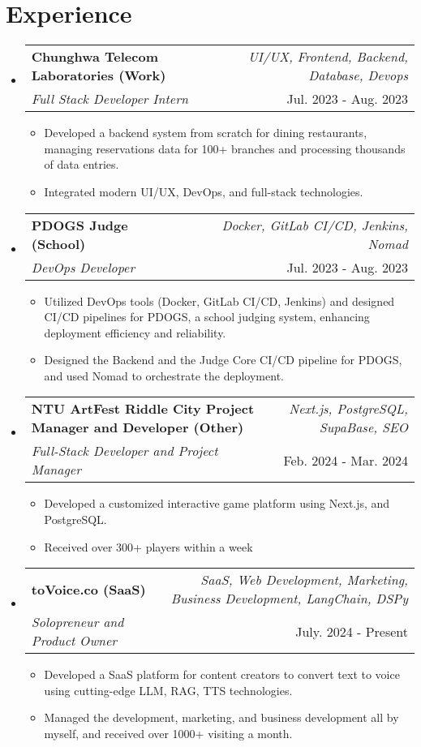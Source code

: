 \documentclass[a4paper,11pt]{article}
\makeatletter
\newcommand{\resumeSubheading}[4]{
\vspace{0.5mm}\item
    \begin{tabular*}{0.98\textwidth}[t]{l@{\extracolsep{\fill}}r}
        \textbf{#1} & \textit{\footnotesize{#4}} \\
        \textit{\footnotesize{#3}} &  \footnotesize{#2}\\
    \end{tabular*}
    \vspace{-2.4mm}
}
\newcommand{\resumeSubHeadingListStart}{\begin{itemize}[leftmargin=*,labelsep=0mm]}
\newcommand{\resumeItemListStart}{\begin{justify}\begin{itemize}[leftmargin=3ex, rightmargin=2ex, noitemsep,labelsep=1.2mm,itemsep=0mm]\small}
\newcommand{\resumeSubHeadingListEnd}{\end{itemize}\vspace{2mm}}
\newcommand{\resumeItemListEnd}{\end{itemize}\end{justify}\vspace{-2mm}}
\makeatother
\begin{document}
\section{\textbf{Experience}}
\resumeSubHeadingListStart

\resumeSubheading
{Chunghwa Telecom Laboratories (Work)}{Jul. 2023 - Aug. 2023}
{Full Stack Developer Intern}{UI/UX, Frontend, Backend, Database, Devops}
\vspace{-2.0mm}
\resumeItemListStart
\item {Developed a backend system from scratch for dining restaurants, managing reservations data for 100+ branches and processing thousands of data entries.}
\item {Integrated modern UI/UX, DevOps, and full-stack technologies.}
\resumeItemListEnd

\vspace{-3.0mm}

\resumeSubheading
{PDOGS Judge (School)}{Jul. 2023 - Aug. 2023}
{DevOps Developer}{Docker, GitLab CI/CD, Jenkins, Nomad}
\vspace{-2.0mm}
\resumeItemListStart
\item {Utilized DevOps tools (Docker, GitLab CI/CD, Jenkins) and designed CI/CD pipelines for PDOGS, a school judging system, enhancing deployment efficiency and reliability.}
\item {Designed the Backend and the Judge Core CI/CD pipeline for PDOGS, and used Nomad to orchestrate the deployment.}
\resumeItemListEnd
\vspace{-3.0mm}

\resumeSubheading
{NTU ArtFest Riddle City Project Manager and Developer (Other)}{Feb. 2024 - Mar. 2024}
{Full-Stack Developer and Project Manager}{Next.js, PostgreSQL, SupaBase, SEO}
\vspace{-2.0mm}
\resumeItemListStart
\item {Developed a customized interactive game platform using Next.js, and PostgreSQL.}
\item {Received over 300+ players within a week}
\resumeItemListEnd
\vspace{-3.0mm}
\resumeSubheading
{toVoice.co (SaaS)}{July. 2024 - Present}
{Solopreneur and Product Owner}{SaaS, Web Development, Marketing, Business Development, LangChain, DSPy}
\vspace{-2.0mm}
\resumeItemListStart
\item {Developed a SaaS platform for content creators to convert text to voice using cutting-edge LLM, RAG, TTS technologies.}
\item {Managed the development, marketing, and business development all by myself, and received over 1000+ visiting a month.}
\resumeItemListEnd
\resumeSubHeadingListEnd
\vspace{-9mm}
\end{document}
